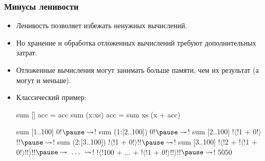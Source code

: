 \documentclass[11pt]{beamer}
\begin{document}
\begin{frame}[fragile]
  \frametitle{Минусы ленивости}
  \begin{itemize}
    \item Ленивость позволяет избежать ненужных вычислений.
    \item Но хранение и обработка отложенных вычислений требуют дополнительных затрат.
    \item Отложенные вычисления могут занимать больше памяти, чем их результат (а могут и меньше).
    \item Классический пример:
          \begin{haskellsmall}
            sum [] acc = acc
            sum (x:xs) acc = sum xs (x + acc)

            sum [1..100] 0!$\pause \rightsquigarrow$! sum (1:[2..100]) 0!$\pause \rightsquigarrow$!
            sum [2..100] !$\langle$!1 + 0!$\rangle$!!$\pause \rightsquigarrow$! sum (2:[3..100]) !$\langle$!1 + 0!$\rangle$!!$\pause \rightsquigarrow$!
            sum [3..100] !$\langle$!2 + !$\langle$!1 + 0!$\rangle$!!$\rangle$!!$\pause \rightsquigarrow \ \ldots\ \rightsquigarrow$!
            !$\langle$!100 + ... + !$\langle$!1 + 0!$\rangle$!!$\rangle$!!$\pause \rightsquigarrow $! 5050
          \end{haskellsmall}
  \end{itemize}
\end{frame}
\end{document}
